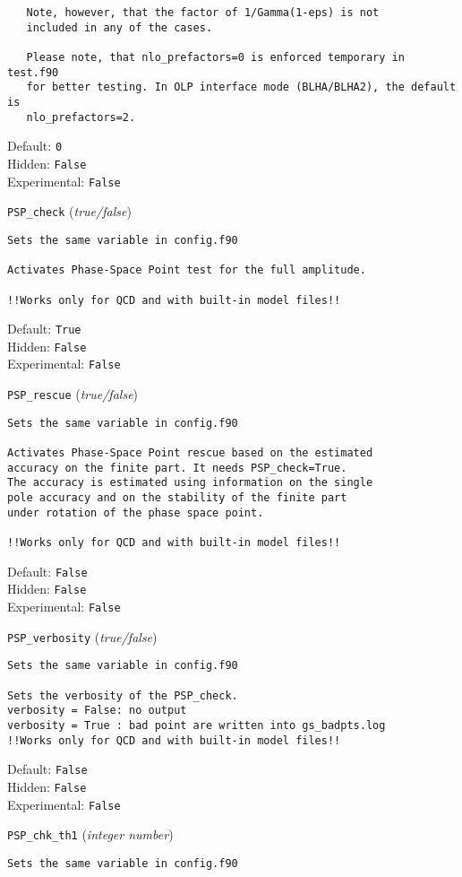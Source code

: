 \begin{basedescript}{\desclabelstyle{\pushlabel}}
\begin{verbatim}
   Note, however, that the factor of 1/Gamma(1-eps) is not
   included in any of the cases.

   Please note, that nlo_prefactors=0 is enforced temporary in test.f90
   for better testing. In OLP interface mode (BLHA/BLHA2), the default is
   nlo_prefactors=2.
\end{verbatim}
Default: \verb|0|
\\Hidden: \verb|False|
\\Experimental: \verb|False|
\\\item[\colorbox{gray!30}{\texttt{PSP\_check}}] (\textit{true/false})
\begin{verbatim}
Sets the same variable in config.f90

Activates Phase-Space Point test for the full amplitude.

!!Works only for QCD and with built-in model files!!
\end{verbatim}
Default: \verb|True|
\\Hidden: \verb|False|
\\Experimental: \verb|False|
\\\item[\colorbox{gray!30}{\texttt{PSP\_rescue}}] (\textit{true/false})
\begin{verbatim}
Sets the same variable in config.f90

Activates Phase-Space Point rescue based on the estimated
accuracy on the finite part. It needs PSP_check=True.
The accuracy is estimated using information on the single
pole accuracy and on the stability of the finite part
under rotation of the phase space point.

!!Works only for QCD and with built-in model files!!
\end{verbatim}
Default: \verb|False|
\\Hidden: \verb|False|
\\Experimental: \verb|False|
\\\item[\colorbox{gray!30}{\texttt{PSP\_verbosity}}] (\textit{true/false})
\begin{verbatim}
Sets the same variable in config.f90

Sets the verbosity of the PSP_check.
verbosity = False: no output
verbosity = True : bad point are written into gs_badpts.log
!!Works only for QCD and with built-in model files!!
\end{verbatim}
Default: \verb|False|
\\Hidden: \verb|False|
\\Experimental: \verb|False|
\\\item[\colorbox{gray!30}{\texttt{PSP\_chk\_th1}}] (\textit{integer number})
\begin{verbatim}
Sets the same variable in config.f90


\end{verbatim}
\end{basedescript}
